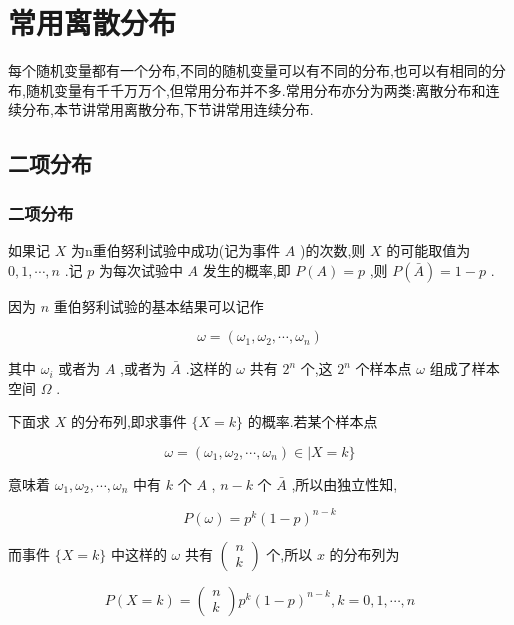 \section{常用离散分布}\label{sec:2.4}

每个随机变量都有一个分布,不同的随机变量可以有不同的分布,也可以有相同的分布,随机变量有千千万万个,但常用分布并不多.常用分布亦分为两类:离散分布和连续分布,本节讲常用离散分布,下节讲常用连续分布.

\subsection{二项分布}\label{ssec:2.4.1}

\subsubsection{二项分布}

如果记 $ X $ 为n重伯努利试验中成功(记为事件 $ A $ )的次数,则 $ X $ 的可能取值为 $ 0,1, \cdots, n $ .记 $ p $ 为每次试验中 $ A $ 发生的概率,即 $ P(A)=p $ ,则 $ P(\bar{A})=1-p $ .

因为 $ n $ 重伯努利试验的基本结果可以记作


\[
\omega=\left(\omega_{1}, \omega_{2}, \cdots, \omega_{n}\right)
\]

其中 $ \omega_{i} $ 或者为 $ A $ ,或者为 $ \bar{A} $ .这样的 $ \omega $ 共有 $ 2^{n} $ 个,这 $ 2^{n} $ 个样本点 $ \omega $ 组成了样本空间 $ \Omega $ .

下面求 $ X $ 的分布列,即求事件 $ \{X=k\} $ 的概率.若某个样本点

\[
\omega=\left(\omega_{1}, \omega_{2}, \cdots, \omega_{n}\right) \in | X=k \}
\]

意味着 $ \omega_{1}, \omega_{2}, \cdots, \omega_{n} $ 中有 $ k $ 个 $ A $ , $ n-k $ 个 $ \bar{A} $ ,所以由独立性知,

\[
P(\omega)=p^{k}(1-p)^{n-k}
\]

而事件 $ \{X=k\} $ 中这样的 $ \omega $ 共有 $ \left( \begin{array}{l}{n} \\ {k}\end{array}\right) $ 个,所以 $ x $ 的分布列为

\begin{equation}
P(X=k)=\left( \begin{array}{l}{n} \\ {k}\end{array}\right) p^{k}(1-p)^{n-k}, k=0,1, \cdots, n \label{eq:2.4.1}
\end{equation}


